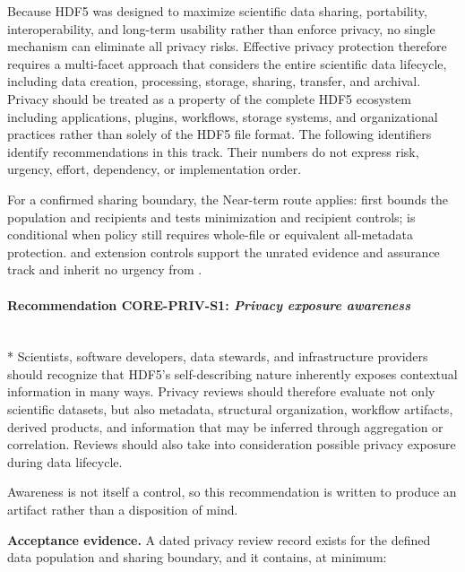 \documentclass[../main.tex]{subfiles}
\begin{document}
Because HDF5 was designed to maximize scientific data sharing, portability, 
interoperability, and long-term usability rather than enforce privacy, 
no single mechanism can eliminate all privacy risks. Effective privacy protection 
therefore requires a multi-facet approach that considers the entire scientific data 
lifecycle, including data creation, processing, storage, sharing, transfer, 
and archival. Privacy should be treated as a property of the complete HDF5 ecosystem 
including applications, plugins, workflows, storage systems, and organizational 
practices rather than solely of the HDF5 file format. 
The following  identifiers identify recommendations in this
track. Their numbers do not express risk, urgency, effort, dependency, or
implementation order.

For a confirmed  sharing boundary, the Near-term route
applies:  first bounds the population and recipients and tests
minimization and recipient controls;  is conditional when policy
still requires whole-file or equivalent all-metadata protection.
 and extension controls support the unrated
 evidence and assurance track and inherit no urgency from
.

\paragraph{Recommendation CORE-PRIV-S1: \emph{Privacy exposure awareness}}\mbox{}\\*
Scientists, software developers, data stewards, and infrastructure providers should
recognize that HDF5's self-describing nature inherently exposes contextual
information in many ways. Privacy reviews should therefore evaluate not only
scientific datasets, but also metadata, structural organization, workflow artifacts,
derived products, and information that may be inferred through aggregation or
correlation. Reviews should also take into consideration possible privacy
exposure during data lifecycle.

Awareness is not itself a control, so this recommendation is written to
produce an artifact rather than a disposition of mind.

\noindent\textbf{Acceptance evidence.}
A dated privacy review record exists for the defined data population and
sharing boundary, and it contains, at minimum:
\end{document}
